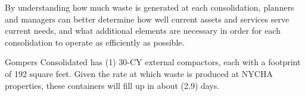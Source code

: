 
    By understanding how much waste is generated at each consolidation, planners and managers
    can better determine how well current assets and services serve current needs, and what additional 
    elements are necessary in order for each consolidation to operate as efficiently as possible. 

    Gompers Consolidated has (1) 30-CY external compactors, each with a footprint of 192 square feet. Given the rate at which waste is produced at NYCHA properties, these containers will fill
    up in about (2.9) days.